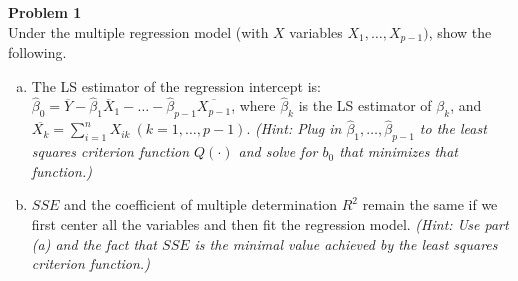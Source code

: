 \documentclass{article}
\newenvironment{problem}[2][Problem]
    { \begin{mdframed}[backgroundcolor=gray!20] \textbf{#1 #2} \\}
    {  \end{mdframed}}
\begin{document}
\begin{problem}{1}
Under the multiple regression model (with $X$ variables $X_1, \ldots , X_{p - 1})$, show the following.
\begin{enumerate}[(a)]
\item The LS estimator of the regression intercept is:
$\hat \beta_0 = \overline Y  - \hat \beta_1 \overline X_1 - \ldots - \hat \beta_{p -1} \overline{X_{p - 1}}$,
where $\hat \beta_k$ is the LS estimator of $\beta_k$, and $\overline{X_k} = \sum_{i=1}^n X_{ik} \ (k=1, \ldots ,p - 1)$.
\emph{(Hint: Plug in $\hat \beta_1, \ldots , \hat \beta_{p - 1}$ to the least squares criterion function $Q( \cdot )$ and solve for $b_0$ that minimizes that function.)}
\item $SSE$ and the coefficient of multiple determination $R^2$ remain the same if we first center all the variables and then fit the regression model.
\emph{(Hint: Use part (a) and the fact that $SSE$ is the minimal value achieved by the least squares criterion function.)}
\end{enumerate}
\end{problem}
\end{document}
